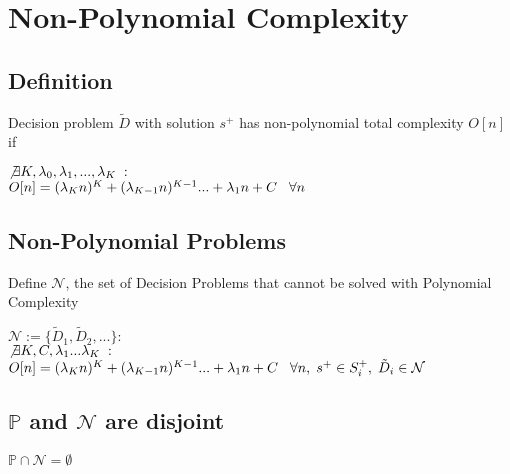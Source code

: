 \documentclass[11pt]{article}
\begin{document}








\newpage
\section{Non-Polynomial Complexity}
\subsection{Definition}
Decision problem $\tilde{D}$ with solution $s^+$ has non-polynomial total complexity $O[n]$ if
\begin{center}
$\not \exists K,\lambda_0,\lambda_1,...,\lambda_K \hspace{1mm} :$
\\ \vspace{2mm}
$O[n] = (\lambda_K n)^K + (\lambda_{K-1} n)^{K-1}... + \lambda_1 n + C \hspace{3mm} \forall n$
\end{center}


\subsection{Non-Polynomial Problems}
Define $\mathcal{N}$, the set of Decision Problems that cannot be solved with Polynomial Complexity
\begin{center}
$
\mathcal{N} := \{\tilde{D}_1,\tilde{D}_2,...\} :
$
\\ \vspace{2mm}
$\not \exists K,C,\lambda_1...\lambda_K \hspace{1mm} :$
\\ \vspace{2mm}
$O[n] = (\lambda_K n)^K + (\lambda_{K-1} n)^{K-1}... + \lambda_1 n + C \hspace{3mm} \forall n, \hspace{1mm}  s^+ \in S^+_i, \hspace{1mm} \tilde{D}_i \in \mathcal{N}$
\end{center}

\subsection{$\mathbb{P}$ and $\mathcal{N}$ are disjoint}
\begin{center}
\vspace{2mm}
$
\mathbb{P} \cap \mathcal{N} = \emptyset
$
\end{center}
\end{document}
